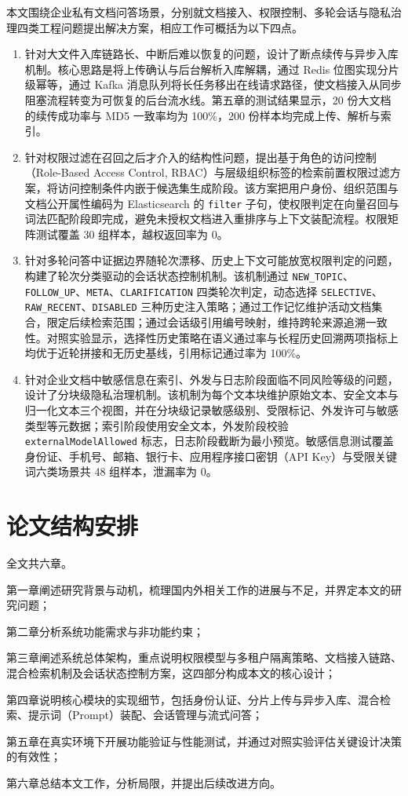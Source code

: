 本文围绕企业私有文档问答场景，分别就文档接入、权限控制、多轮会话与隐私治理四类工程问题提出解决方案，相应工作可概括为以下四点。
\begin{enumerate}[label=（\arabic*）]
    \item 针对大文件入库链路长、中断后难以恢复的问题，设计了断点续传与异步入库机制。核心思路是将上传确认与后台解析入库解耦，通过 Redis 位图实现分片级幂等，通过 Kafka 消息队列将长任务移出在线请求路径，使文档接入从同步阻塞流程转变为可恢复的后台流水线。第五章的测试结果显示，20 份大文档的续传成功率与 MD5 一致率均为 100\%，200 份样本均完成上传、解析与索引。
    
    \item 针对权限过滤在召回之后才介入的结构性问题，提出基于角色的访问控制（Role-Based Access Control, RBAC）与层级组织标签的检索前置权限过滤方案，将访问控制条件内嵌于候选集生成阶段。该方案把用户身份、组织范围与文档公开属性编码为 Elasticsearch 的 \texttt{filter} 子句，使权限判定在向量召回与词法匹配阶段即完成，避免未授权文档进入重排序与上下文装配流程。权限矩阵测试覆盖 30 组样本，越权返回率为 0。
    
    \item 针对多轮问答中证据边界随轮次漂移、历史上下文可能放宽权限判定的问题，构建了轮次分类驱动的会话状态控制机制。该机制通过 \texttt{NEW\_TOPIC}、\texttt{FOLLOW\_UP}、\texttt{META}、\texttt{CLARIFICATION} 四类轮次判定，动态选择 \texttt{SELECTIVE}、\texttt{RAW\_RECENT}、\texttt{DISABLED} 三种历史注入策略；通过工作记忆维护活动文档集合，限定后续检索范围；通过会话级引用编号映射，维持跨轮来源追溯一致性。对照实验显示，选择性历史策略在语义通过率与长程历史回溯两项指标上均优于近轮拼接和无历史基线，引用标记通过率为 100\%。
    
    \item 针对企业文档中敏感信息在索引、外发与日志阶段面临不同风险等级的问题，设计了分块级隐私治理机制。该机制为每个文本块维护原始文本、安全文本与归一化文本三个视图，并在分块级记录敏感级别、受限标记、外发许可与敏感类型等元数据；索引阶段使用安全文本，外发阶段校验 \texttt{externalModelAllowed} 标志，日志阶段截断为最小预览。敏感信息测试覆盖身份证、手机号、邮箱、银行卡、应用程序接口密钥（API Key）与受限关键词六类场景共 48 组样本，泄漏率为 0。
\end{enumerate}

\section{论文结构安排}
\label{sec:arrangement}

全文共六章。

第一章阐述研究背景与动机，梳理国内外相关工作的进展与不足，并界定本文的研究问题；

第二章分析系统功能需求与非功能约束；

第三章阐述系统总体架构，重点说明权限模型与多租户隔离策略、文档接入链路、混合检索机制及会话状态控制方案，这四部分构成本文的核心设计；

第四章说明核心模块的实现细节，包括身份认证、分片上传与异步入库、混合检索、提示词（Prompt）装配、会话管理与流式问答；

第五章在真实环境下开展功能验证与性能测试，并通过对照实验评估关键设计决策的有效性；

第六章总结本文工作，分析局限，并提出后续改进方向。
